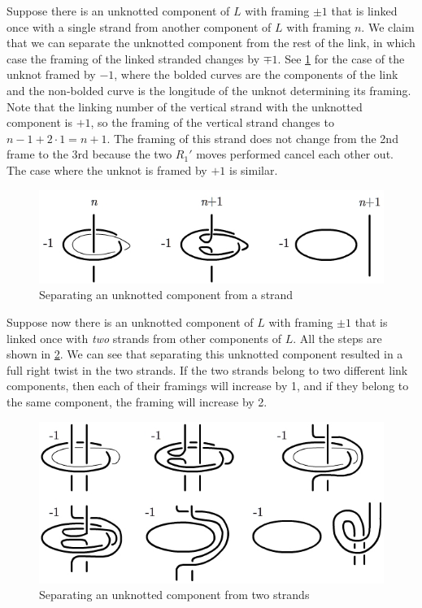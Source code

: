 \begin{example}
Suppose there is an unknotted component of $L$ with framing $\pm 1$ that is linked once with a single strand from another component of $L$ with framing $n$. We claim that we can separate the unknotted component from the rest of the link, in which case the framing of the linked stranded changes by $\mp 1$. See \cref{fenn-rourke-1} for the case of the unknot framed by $-1$, where the bolded curves are the components of the link and the non-bolded curve is the longitude of the unknot determining its framing. Note that the linking number of the vertical strand with the unknotted component is $+1$, so the framing of the vertical strand changes to $n-1+2\cdot 1 = n+1$. The framing of this strand does not change from the 2nd frame to the 3rd because the two $R_1'$ moves performed cancel each other out. The case where the unknot is framed by $+1$ is similar.

\begin{figure}[tb]
\centering
\includegraphics[scale=.6]{graphics/fenn-rourke-1}
\caption{Separating an unknotted component from a strand}
\label{fenn-rourke-1}
\end{figure}
\end{example}

\begin{example}
Suppose now there is an unknotted component of $L$ with framing $\pm 1$ that is linked once with \emph{two} strands from other components of $L$. All the steps are shown in \cref{fenn-rourke-2}. We can see that separating this unknotted component resulted in a full right twist in the two strands. If the two strands belong to two different link components, then each of their framings will increase by 1, and if they belong to the same component, the framing will increase by 2.

\begin{figure}[tb]
\centering
\includegraphics[scale=.6]{graphics/fenn-rourke-2}
\caption{Separating an unknotted component from two strands}
\label{fenn-rourke-2}
\end{figure}
\end{example}

